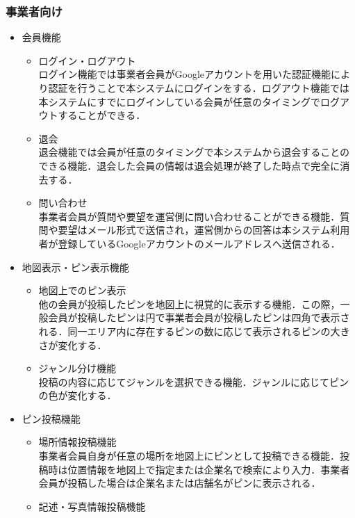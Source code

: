 \subsubsection{事業者向け}
\begin{itemize}[itemsep=10pt]
    \item 会員機能
    \begin{itemize}[itemsep=10pt]
        \item ログイン・ログアウト \mbox{}\\
        ログイン機能では事業者会員がGoogleアカウントを用いた認証機能により認証を行うことで本システムにログインをする．ログアウト機能では本システムにすでにログインしている会員が任意のタイミングでログアウトすることができる．
        \item 退会 \mbox{}\\
        退会機能では会員が任意のタイミングで本システムから退会することのできる機能．退会した会員の情報は退会処理が終了した時点で完全に消去する．
        \item 問い合わせ \mbox{}\\
        事業者会員が質問や要望を運営側に問い合わせることができる機能．質問や要望はメール形式で送信され，運営側からの回答は本システム利用者が登録しているGoogleアカウントのメールアドレスへ送信される．
    \end{itemize}
    \item 地図表示・ピン表示機能
    \begin{itemize}[itemsep=10pt]
        \item 地図上でのピン表示 \mbox{}\\
        他の会員が投稿したピンを地図上に視覚的に表示する機能．この際，一般会員が投稿したピンは円で事業者会員が投稿したピンは四角で表示される．同一エリア内に存在するピンの数に応じて表示されるピンの大きさが変化する．
        \item ジャンル分け機能 \mbox{}\\
        投稿の内容に応じてジャンルを選択できる機能．ジャンルに応じてピンの色が変化する．
    \end{itemize}
    \item ピン投稿機能
    \begin{itemize}[itemsep=10pt]
        \item 場所情報投稿機能 \mbox{}\\
        事業者会員自身が任意の場所を地図上にピンとして投稿できる機能．投稿時は位置情報を地図上で指定または企業名で検索により入力．事業者会員が投稿した場合は企業名または店舗名がピンに表示される．
        \item 記述・写真情報投稿機能 \mbox{}\\

\end{itemize}
\end{itemize}
